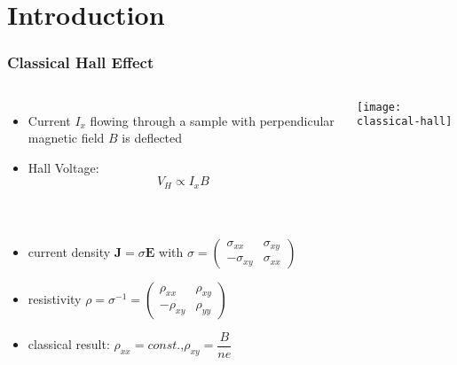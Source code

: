 \section{Introduction}
\begin{frame}
\frametitle{Classical Hall Effect}

\begin{columns}
	\column{6cm}
	\begin{itemize}
		\item Current $I_x$ flowing through a sample with perpendicular magnetic field $B$ is deflected
		\item Hall Voltage:
		\begin{equation*}
		V_H \propto I_x B
		\end{equation*}
		 
	\end{itemize}
		 
	\column[]{6cm}
	\texttt{[image: classical-hall]}
\end{columns}
\begin{columns}
	\column[]{12cm}
	\begin{itemize}
		 \item current density $\boldsymbol{J} = \sigma \boldsymbol{E}$ \quad
		with $\sigma = \begin{pmatrix} \sigma_{xx} & \sigma_{xy}\\ -\sigma_{xy} & \sigma_{xx}\end{pmatrix}$
		
		\item resistivity $\rho = \sigma^{-1} = \begin{pmatrix} \rho_{xx} & \rho_{xy}\\ -\rho_{xy} & \rho_{yy}\end{pmatrix}$
		
		\item classical result: $\rho_{xx} = const.$,\quad $\rho_{xy} = \dfrac{B}{ne}$
	\end{itemize}
\end{columns}	 
	
		
	
\end{frame}


